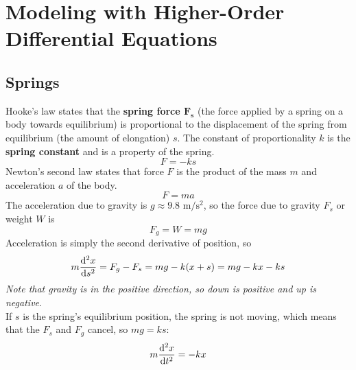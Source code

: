 \documentclass[12pt, A4]{article}
\begin{document}
	\section{Modeling with Higher-Order Differential Equations}
		\subsection{Springs}
			Hooke's law states that the \textbf{spring force \(\bm{F_s}\)} (the force applied by a spring on a body towards equilibrium) is proportional to the displacement of the spring from equilibrium (the amount of elongation) \(s\). The constant of proportionality \(k\) is the \textbf{spring constant} and is a property of the spring.
				\[F = -ks\]
			Newton's second law states that force \(F\) is the product of the mass \(m\) and acceleration \(a\) of the body.
				\[F = ma\]
				The acceleration due to gravity is \(g \approx 9.8\) \(\mathrm{m/s^2}\), so the force due to gravity \(F_s\) or weight \(W\) is
					\[F_g = W = mg\]
				Acceleration is simply the second derivative of position, so
				\[
					m\dv[2]{x}{s} =
						F_g - F_s
						= mg - k(x + s)
						= mg - kx - ks
				\]
				\textit{Note that gravity is in the positive direction, so down is positive and up is negative}. \\ 
				If \(s\) is the spring's equilibrium position, the spring is not moving, which means that the \(F_s\) and \(F_g\) cancel, so \(mg = ks\):
				\[m\dv[2]{x}{t} = -kx\]
\end{document}
